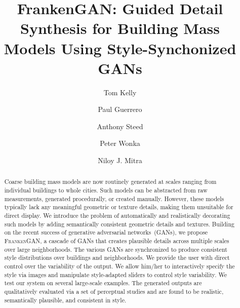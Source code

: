 \documentclass[acmtog]{acmart} %
\newcommand{\systemName}{\textsc{FrankenGAN}\xspace}
\begin{document}
\title{FrankenGAN: Guided Detail Synthesis for Building Mass Models Using Style-Synchonized GANs}

% 
% 



\author{Tom Kelly}

\author{Paul Guerrero}
\authornotemark[1]

\author{Anthony Steed}

\author{Peter Wonka}%

\author{Niloy J. Mitra}
\authornotemark[2]



\begin{abstract}
Coarse building mass models are now routinely generated at scales ranging from individual buildings to whole cities. Such models can be abstracted from raw measurements, generated procedurally, or created manually. However, these models typically lack any meaningful geometric or texture details, making them unsuitable for direct display. We introduce the problem of automatically and realistically decorating such models by adding semantically consistent geometric details and textures. Building on the recent success of generative adversarial networks~(GANs), we propose \systemName, a cascade of GANs that creates plausible details across multiple scales over large neighborhoods. The various GANs are synchronized to produce consistent style distributions over  buildings and neighborhoods. We provide the user with direct control over the variability of the output. We allow him/her to interactively specify the style via images and manipulate style-adapted sliders to control style variability. We test our system on several large-scale examples. The generated outputs are qualitatively evaluated via a set of perceptual studies and are found to be realistic, semantically plausible, and consistent in style.
\end{abstract}
\end{document}
